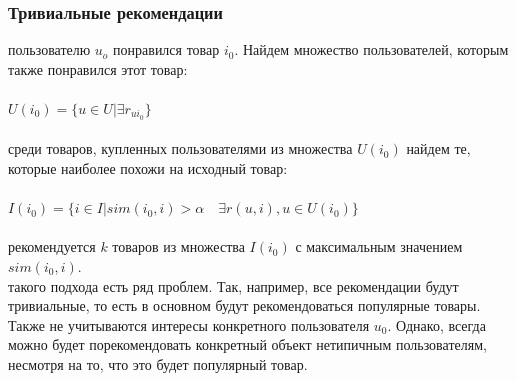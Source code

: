 \documentclass{article}
\newcommand\tab[1][1cm]{\hspace*{#1}}
\begin{document}
\subsubsection{Тривиальные рекомендации}
 пользователю ﻿$u_o$ понравился товар $i_0$. Найдем множество пользователей, которым также понравился этот товар:\\
\\
\tab$U(i_0)=\{u\in U|\exists r_{ui_0}\}$\\
\\
 среди товаров, купленных пользователями из множества ﻿$U(i_0)$ найдем те, которые наиболее похожи на исходный товар:\\
\\
\tab$I(i_0)=\{i\in I|sim(i_0, i)>\alpha \quad \exists r(u, i), u\in U(i_0)\}$\\
\\
 рекомендуется ﻿$k$ товаров из множества ﻿$I(i_0)$ с максимальным значением $sim(i_0,i)$.\\
 такого подхода есть ряд проблем. Так, например, все рекомендации будут тривиальные, то есть в основном будут рекомендоваться популярные товары. Также не учитываются интересы конкретного пользователя ﻿$u_0$. Однако, всегда можно будет порекомендовать конкретный объект нетипичным пользователям, несмотря на то, что это будет популярный товар.
\end{document}
